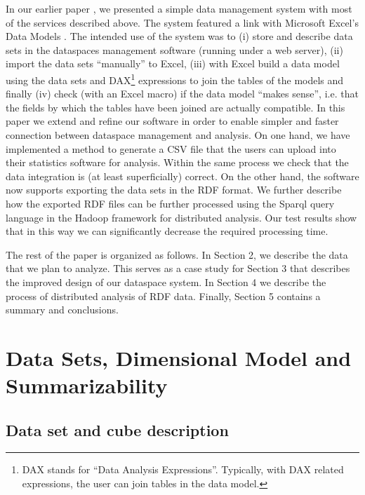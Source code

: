\documentclass[USenglish,twocolumn]{article}
\begin{document}
In our earlier paper \cite{Nii181}, we presented a simple data management system with
most of the services described above. The system featured a link with
Microsoft Excel's Data Models . The intended use of the system was to
(i) store and describe data sets in the dataspaces management software
(running under a web server), (ii) import the data sets ``manually'' to
Excel, (iii) with Excel build a data model using the data sets and
DAX\footnote{DAX stands for ``Data Analysis Expressions''. Typically,
  with DAX related expressions, the user can join tables in the data
  model.} expressions to join the tables of the models and finally (iv)
check (with an Excel macro) if the data model ``makes sense'', i.e. that
the fields by which the tables have been joined are actually compatible.
In this paper we extend and refine our software in order to enable
simpler and faster connection between dataspace management and analysis.
On one hand, we have implemented a method to generate a CSV file that
the users can upload into their statistics software for analysis. Within
the same process we check that the data integration is (at least
superficially) correct. On the other hand, the software now supports
exporting the data sets in the RDF format. We further describe how the
exported RDF files can be further processed using the Sparql query
language in the Hadoop framework for distributed analysis. Our test
results show that in this way we can significantly decrease the required
processing time.

The rest of the paper is organized as follows. In Section 2, we describe
the data that we plan to analyze. This serves as a case study for
Section 3 that describes the improved design of our dataspace system. In
Section 4 we describe the process of distributed analysis of RDF data.
Finally, Section 5 contains a summary and conclusions.


\section{Data Sets, Dimensional Model and Summarizability}

\subsection{Data set and cube description}\label{data-set-and-cube-description}
\end{document}
